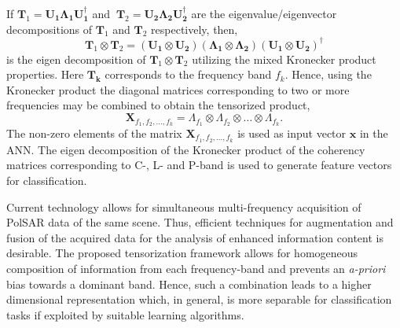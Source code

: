 If $ \mathbf{T}_{1} = \mathbf{U_1}\mathbf{\Lambda_1}\mathbf{U_1^\dagger}$ and $ \ \mathbf{T}_{2} = \mathbf{U_2}\mathbf{\Lambda_2}\mathbf{U_2^\dagger}$ are the eigenvalue/eigenvector decompositions of $\mathbf{T}_{1}$ and $\mathbf{T}_{2}$ respectively, then,
\begin{equation}
\mathbf{T}_{1}\otimes\mathbf{T}_{2}=(\mathbf{U_1}\otimes \mathbf{U_2})(\mathbf{\Lambda_1}\otimes\mathbf{\Lambda_2})(\mathbf{U_1}\otimes \mathbf{U_2})^{\dagger}
\end{equation}
is the eigen decomposition of $\mathbf{T}_{1}\otimes\mathbf{T}_{2}$ utilizing the mixed Kronecker product properties. Here $\mathbf{T_k}$ corresponds to the frequency band $f_k$.  
Hence, using the Kronecker product the diagonal matrices corresponding to two or more frequencies may be combined to obtain the tensorized product, 
\begin{equation}
\mathbf{X}_{f_1, f_2, \ldots ,f_k}  =  \Lambda_{f_1} \otimes \Lambda_{f_2} \otimes \ldots \otimes {\Lambda_{f_k}}.
\end{equation}
The non-zero elements of the matrix $\mathbf{X}_{f_1, f_2, \ldots ,f_k}$ is used as input vector $\bm{x}$ in the  ANN. The eigen decomposition of the Kronecker product of the coherency matrices corresponding to C-, L- and P-band is used to generate feature vectors for classification. 

Current technology allows for simultaneous multi-frequency acquisition of PolSAR data of the same scene. Thus, efficient techniques for augmentation and fusion of the acquired data for the analysis of enhanced information content is desirable. The proposed tensorization framework allows for homogeneous composition of information from each frequency-band and prevents an \emph{a-priori} bias towards a dominant band. Hence, such a combination leads to a higher dimensional representation which, in general, is more separable for classification tasks if exploited by suitable learning algorithms. 


